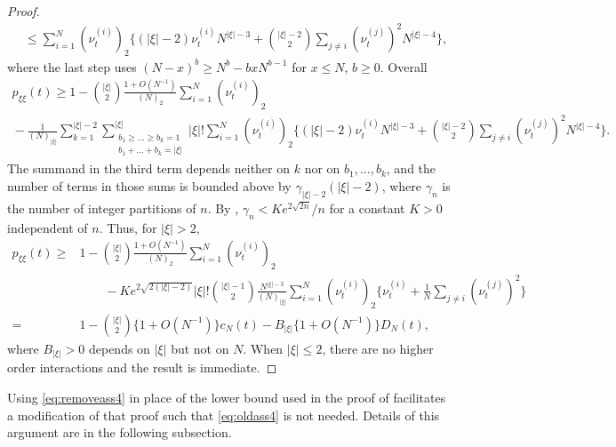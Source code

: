 \documentclass{article} %
\theoremstyle{definition}
\newcommand{\1}[1]{\mathbbm{1}_{\{#1\}}}
\begin{document}
\begin{proof}
\begin{align*}
&\leq \sum_{ i = 1 }^N ( \nu_t^{ ( i ) } )_2 \Bigg\{ ( | \xi | - 2 ) \nu_t^{ ( i ) } N^{ | \xi | - 3 } + \binom{ | \xi | - 2 }{ 2 } \sum_{ j \neq i } ( \nu_t^{ ( j ) } )^2 N^{ | \xi | - 4 } \Bigg\},
\end{align*}
where the last step uses $(N - x)^b \geq N^b - b x N^{ b - 1 }$ for $x \leq N$, $b \geq 0$.
Overall
\begin{multline*}
p_{ \xi \xi }( t ) \geq 1 - \binom{ | \xi | }{ 2 } \frac{ 1 + O( N^{ -1 } ) }{ ( N )_2 } \sum_{ i = 1 }^N ( \nu_t^{ ( i ) } )_2 \\
{} - \frac{ 1 }{ ( N )_{ | \xi | } } \sum_{ k = 1 }^{ | \xi | - 2 } \sum_{ \substack{ b_1 \geq \ldots \geq b_k = 1 \\ b_1 + \ldots + b_k = | \xi | } }^{ | \xi | } | \xi |! \sum_{ i = 1 }^N ( \nu_t^{ ( i ) } )_2 \Bigg\{ ( | \xi | - 2 ) \nu_t^{ ( i ) } N^{ | \xi | - 3 } + \binom{ | \xi | - 2 }{ 2 } \sum_{ j \neq i } ( \nu_t^{ ( j ) } )^2 N^{ | \xi | - 4 } \Bigg\}.
\end{multline*}
The summand in the third term depends neither on $k$ nor on $b_1, \ldots, b_k$, and the number of terms in those sums is bounded above by $\gamma_{ | \xi | - 2 } ( | \xi | - 2 )$, where $\gamma_n$ is the number of integer partitions of $n$.
By \cite[Section 2]{hardy1918}, $\gamma_n < K e^{ 2 \sqrt{ 2 n } } / n$ for a constant $K > 0$ independent of $n$.
Thus, for $|\xi| > 2$,
\begin{align*}
p_{ \xi \xi }( t ) \geq {}& 1 - \binom{ | \xi | }{ 2 } \frac{ 1 + O( N^{ -1 } ) }{ ( N )_2 } \sum_{ i = 1 }^N ( \nu_t^{ ( i ) } )_2 \\
&\qquad {}- K e^{ 2 \sqrt{ 2 ( | \xi | - 2 ) } } | \xi |! \binom{ | \xi | -1 }{ 2 } \frac{ N^{ | \xi | - 3 } }{ ( N )_{ | \xi | } } \sum_{ i = 1 }^N ( \nu_t^{ ( i ) } )_2 \Bigg\{ \nu_t^{ ( i ) } + \frac{ 1 }{ N } \sum_{ j \neq i } ( \nu_t^{ ( j ) } )^2 \Bigg\} \\
={} & 1 - \binom{ | \xi | }{ 2 } \{ 1 + O( N^{ -1 } ) \} c_N( t ) - B_{ | \xi | } \{ 1 + O( N^{ -1 } ) \} D_N( t ) ,
\end{align*}
where $B_{ | \xi | } > 0$ depends on $| \xi |$ but not on $N$. 
When $|\xi| \leq 2$, there are no higher order interactions and the result is immediate.
\end{proof}
Using \eqref{eq:removeass4} in place of
the lower bound used in the proof of \cite[Theorem 1]{koskela2018} facilitates a modification of that proof such that \eqref{eq:oldass4} is not needed.
Details of this argument are in the following subsection.
\end{document}
